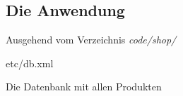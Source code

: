 \subsection*{Die Anwendung}
{\small Ausgehend vom Verzeichnis {\em code/shop/}}
\begin{VarDescription}{etc/db.xml}
  \item[etc/db.xml] Die Datenbank mit allen Produkten
\end{VarDescription}

